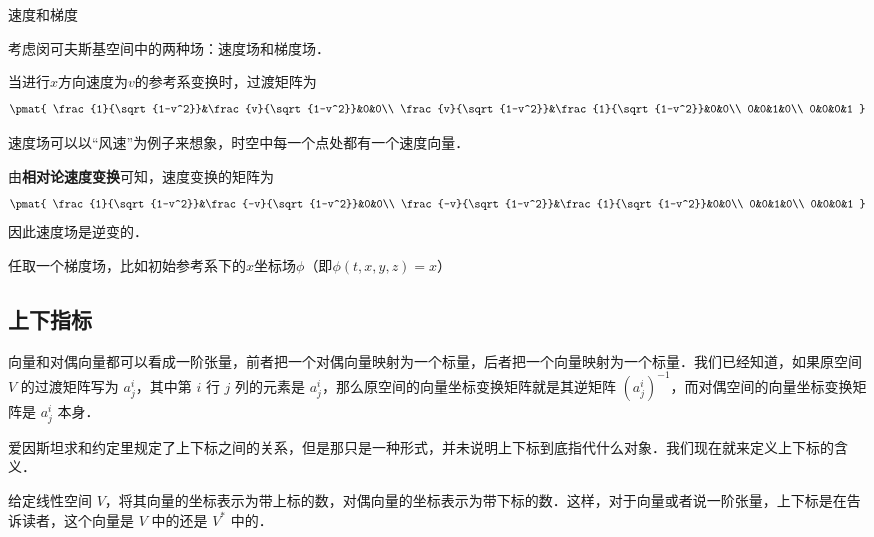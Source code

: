 \begin{example}{速度和梯度}

考虑闵可夫斯基空间中的两种场：速度场和梯度场．

当进行$x$方向速度为$v$的参考系变换时，过渡矩阵为
\begin{equation}
\pmat{
    \frac{1}{\sqrt{1-v^2}}&\frac{v}{\sqrt{1-v^2}}&0&0\\
    \frac{v}{\sqrt{1-v^2}}&\frac{1}{\sqrt{1-v^2}}&0&0\\
    0&0&1&0\\
    0&0&0&1
}
\end{equation}

速度场可以以“风速”为例子来想象，时空中每一个点处都有一个速度向量．

由\textbf{相对论速度变换}可知，速度变换的矩阵为
\begin{equation}
\pmat{
    \frac{1}{\sqrt{1-v^2}}&\frac{-v}{\sqrt{1-v^2}}&0&0\\
    \frac{-v}{\sqrt{1-v^2}}&\frac{1}{\sqrt{1-v^2}}&0&0\\
    0&0&1&0\\
    0&0&0&1
}
\end{equation}
因此速度场是逆变的．

任取一个梯度场，比如初始参考系下的$x$坐标场$\phi$（即$\phi(t, x, y, z)=x$）

\end{example}




\subsection{上下指标}

向量和对偶向量都可以看成一阶张量，前者把一个对偶向量映射为一个标量，后者把一个向量映射为一个标量．我们已经知道，如果原空间 $V$ 的过渡矩阵写为 $a^i_j$，其中第 $i$ 行 $j$ 列的元素是 $a^i_j$，那么原空间的向量坐标变换矩阵就是其逆矩阵 $(a^i_j)^{-1}$，而对偶空间的向量坐标变换矩阵是 $a^i_j$ 本身．

爱因斯坦求和约定里规定了上下标之间的关系，但是那只是一种形式，并未说明上下标到底指代什么对象．我们现在就来定义上下标的含义．

\begin{definition}{}
给定线性空间 $V$，将其向量的坐标表示为带上标的数，对偶向量的坐标表示为带下标的数．这样，对于向量或者说一阶张量，上下标是在告诉读者，这个向量是 $V$ 中的还是 $V^*$ 中的．
\end{definition}


